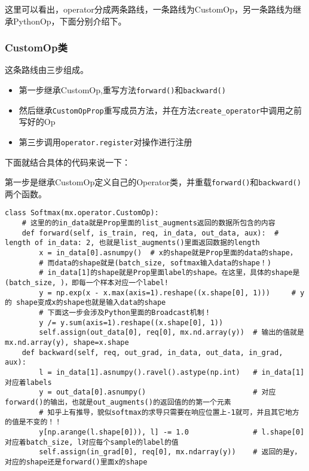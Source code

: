 这里可以看出，operator分成两条路线，一条路线为CustomOp，另一条路线为继承PythonOp，下面分别介绍下。

\subsubsection{CustomOp类}

这条路线由三步组成。

\begin{itemize}
\item 第一步继承CustomOp,重写方法\verb|forward()|和\verb|backward()|
\item 然后继承\verb|CustomOpProp|重写成员方法，并在方法\verb|create_operator|中调用之前写好的Op
\item 第三步调用\verb|operator.register|对操作进行注册
\end{itemize}

下面就结合具体的代码来说一下：

第一步是继承CustomOp定义自己的Operator类，并重载\verb|forward()|和\verb|backward()|两个函数。
\begin{lstlisting}
class Softmax(mx.operator.CustomOp):
    # 这里的的in_data就是Prop里面的list_augments返回的数据所包含的内容
    def forward(self, is_train, req, in_data, out_data, aux):  # length of in_data: 2, 也就是list_augments()里面返回数据的length
        x = in_data[0].asnumpy()  # x的shape就是Prop里面的data的shape，
        # 而data的shape就是(batch_size, softmax输入data的shape！)
        # in_data[1]的shape就是Prop里面label的shape。在这里，具体的shape是(batch_size, )，即每一个样本对应一个label!
        y = np.exp(x - x.max(axis=1).reshape((x.shape[0], 1)))     # y 的 shape变成x的shape也就是输入data的shape
        # 下面这一步会涉及Python里面的Broadcast机制！
        y /= y.sum(axis=1).reshape((x.shape[0], 1))  
        self.assign(out_data[0], req[0], mx.nd.array(y))  # 输出的值就是mx.nd.array(y), shape=x.shape
    def backward(self, req, out_grad, in_data, out_data, in_grad, aux):
        l = in_data[1].asnumpy().ravel().astype(np.int)   # in_data[1]对应着labels
        y = out_data[0].asnumpy()                         # 对应forward()的输出，也就是out_augments()的返回值的的第一个元素
        # 知乎上有推导，貌似softmax的求导只需要在响应位置上-1就可，并且其它地方的值是不变的！！
        y[np.arange(l.shape[0])), l] -= 1.0               # l.shape[0]对应着batch_size, l对应每个sample的label的值
        self.assign(in_grad[0], req[0], mx.ndarray(y))    # 返回的是y， 对应的shape还是forward()里面x的shape
\end{lstlisting}


